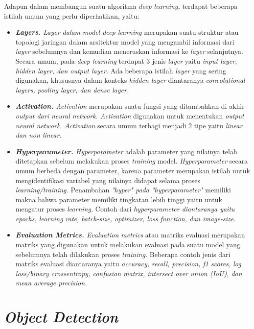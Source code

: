 Adapun dalam membangun suatu algoritma \textit{deep learning,} terdapat beberapa istilah umum yang perlu diperhatikan, yaitu:
\begin{itemize}[nolistsep]
    \item \textit{\textbf{Layers.} Layer \textnormal{dalam model} deep learning} merupakan  suatu struktur atau topologi jaringan dalam arsitektur model yang mengambil informasi dari \textit{layer} sebelumnya dan kemudian meneruskan informasi ke \textit{layer} selanjutnya. Secara umum, pada \textit{deep learning} terdapat 3 jenis \textit{layer} yaitu \textit{input layer, hidden layer, \textnormal{dan} output layer.} Ada beberapa istilah \textit{layer} yang sering digunakan, khususnya dalam konteks \textit{hidden layer} diantaranya \textit{convolutional layers, pooling layer, \textnormal{dan} dense layer.}
    \item \textit{\textbf{Activation.} Activation} merupakan suatu fungsi yang ditambahkan di akhir \textit{output \textnormal{dari} neural network. Activation} digunakan untuk menentukan \textit{output neural network. Activation} secara umum terbagi menjadi 2 tipe yaitu \textit{linear \textnormal{dan} non linear.} 
    \item \textit{\textbf{Hyperparameter.} Hyperparameter} adalah parameter yang nilainya telah ditetapkan sebelum melakukan proses \textit{training} model. \textit{Hyperparameter} secara umum berbeda dengan parameter, karena parameter merupakan istilah untuk mengidentifikasi variabel yang nilainya didapat selama proses \textit{learning/training.} Penambahan \textit{"hyper" \textnormal{pada} "hyperparameter"} memiliki makna bahwa parameter memiliki tingkatan lebih tinggi yaitu untuk mengatur proses \textit{learning.} Contoh dari \textit{hyperparameter \textnormal{diantaranya yaitu} epochs, learning rate, batch-size, optimizer, loss function, \textnormal{dan} image-size.}
    \item \textit{\textbf{Evaluation Metrics.} Evaluation metrics} atau matriks evaluasi merupakan matriks yang digunakan untuk melakukan evaluasi pada suatu model yang sebelumnya telah dilakukan proses \textit{training.} Beberapa contoh jenis dari matriks evaluasi diantaranya yaitu \textit{accuracy, recall, precision, f1 scores, log loss/binary crossentropy, confusion matrix, intersect over union (IoU), \textnormal{dan} mean average precision.}
\end{itemize}

\section{\textit{Object Detection}}
\label{sec:objectdetection}

